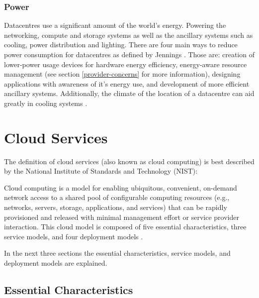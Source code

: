 \documentclass[fullapage,12pt]{article}
\begin{document}

\subsubsection{Power} \label{ssub:power}

Datacentres use a significant amount of the world's energy. Powering the networking, compute and storage systems as well as the ancillary systems such as cooling, power distribution and lighting.
There are four main ways to reduce power consumption for datacentres as defined by Jennings \cite{Jennings2015}. Those are: creation of lower-power usage devices for hardware energy efficiency, energy-aware resource management (see section \ref{provider-concerns} for more information), designing applications with awareness of it's energy use, and development of more efficient ancillary systems. Additionally, the climate of the location of a datacentre can aid greatly in cooling systems \cite{norwaydatacentre}.


\section{Cloud Services} \label{sec:cloud-services}

The definition of cloud services (also known as cloud computing) is best described by the National Institute of Standards and Technology (NIST):

\begin{displayquote}
Cloud computing is a model for enabling ubiquitous, convenient, on-demand network access to a shared pool of configurable computing resources (e.g., networks, servers, storage, applications, and services) that can be rapidly provisioned and released with minimal management effort or service provider interaction. This cloud model is composed of five essential characteristics, three service models, and four deployment models \cite{mell2011nist}.
\end{displayquote}

In the next three sections the essential characteristics, service models, and deployment models are explained.



\subsection{Essential Characteristics} \label{sub:essential-characteristics}
\end{document}

